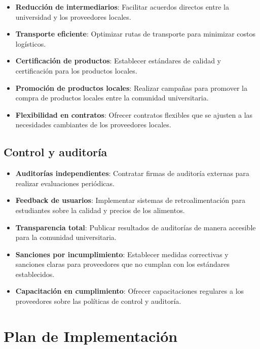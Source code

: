 \documentclass[letterpaper, 11pt]{report}
\begin{document}
\begin{itemize}
      \item \textbf{Reducción de intermediarios}: Facilitar acuerdos directos entre la universidad y los proveedores locales.
      \item \textbf{Transporte eficiente}: Optimizar rutas de transporte para minimizar costos logísticos.
      \item \textbf{Certificación de productos}: Establecer estándares de calidad y certificación para los productos locales.
      \item \textbf{Promoción de productos locales}: Realizar campañas para promover la compra de productos locales entre la comunidad universitaria.
      \item \textbf{Flexibilidad en contratos}: Ofrecer contratos flexibles que se ajusten a las necesidades cambiantes de los proveedores locales.
\end{itemize}

\subsection{Control y auditoría}

\begin{itemize}
      \item  \textbf{Auditorías independientes}: Contratar firmas de auditoría externas para realizar
            evaluaciones periódicas.
      \item  \textbf{Feedback de usuarios}: Implementar sistemas de retroalimentación para
            estudiantes sobre la calidad y precios de los alimentos.
      \item  \textbf{Transparencia total}: Publicar resultados de auditorías de manera accesible para
            la comunidad universitaria.
      \item  \textbf{Sanciones por incumplimiento}: Establecer medidas correctivas y sanciones claras
            para proveedores que no cumplan con los estándares establecidos.
      \item  \textbf{Capacitación en cumplimiento}: Ofrecer capacitaciones regulares a los
            proveedores sobre las políticas de control y auditoría.
\end{itemize}

\section{Plan de Implementación}
\end{document}
